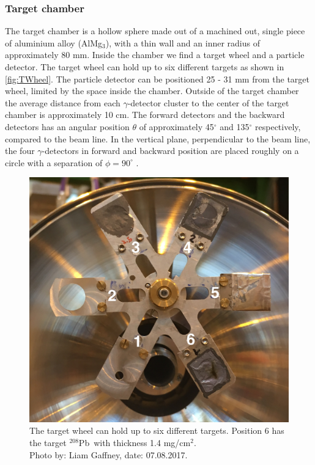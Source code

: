 \documentclass[twoside,english]{uiofysmaster/uiofysmaster}
\newcommand{\Pb}{$^{208}$Pb}
\newcommand{\ga}{$\gamma$}
\begin{document}
\subsubsection{Target chamber}
The target chamber is a hollow sphere made out of a machined out, single piece of aluminium alloy (AlMg$_3$), with a thin wall and an inner radius of approximately 80 mm. Inside the chamber we find a target wheel and a particle detector. The target wheel can hold up to six different targets as shown in \autoref{fig:TWheel}. The particle detector can be positioned 25 - 31 mm from the target wheel, limited by the space inside the chamber. Outside of the target chamber the average distance from each \ga-detector cluster to the center of the target chamber is approximately 10 cm. The forward detectors and the backward detectors has an angular position $\theta$ of approximately 45$^\circ$ and 135$^\circ$ respectively, compared to the beam line. In the vertical plane, perpendicular to the beam line, the four \ga-detectors in forward and backward position are placed roughly on a circle with a separation of $\phi = 90^\circ$ \cite{MB-spect}.  

\begin{figure}[ht]
	\centering
	\includegraphics[width=\linewidth]{Images/Target-wheel.png}
	\caption{The target wheel can hold up to six different targets. Position 6 has the target \Pb\ with thickness 1.4 mg/cm$^2$. \\ Photo by: Liam Gaffney, date: 07.08.2017.}
	\label{fig:TWheel}
\end{figure}
\end{document}
